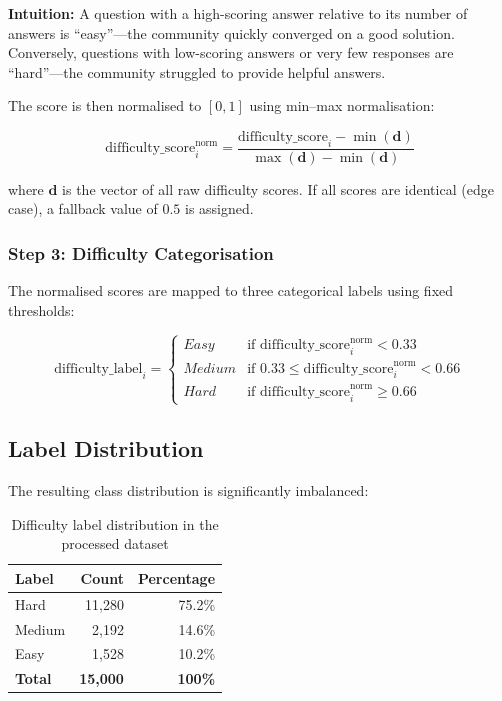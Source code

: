 \documentclass[12pt, a4paper]{article}
\begin{document}
\textbf{Intuition:} A question with a high-scoring answer relative to its number of answers is ``easy''---the community quickly converged on a good solution. Conversely, questions with low-scoring answers or very few responses are ``hard''---the community struggled to provide helpful answers.

The score is then normalised to $[0, 1]$ using min--max normalisation:

\begin{equation}
    \text{difficulty\_score}_i^{\text{norm}} = \frac{\text{difficulty\_score}_i - \min(\mathbf{d})}{\max(\mathbf{d}) - \min(\mathbf{d})}
    \label{eq:minmax}
\end{equation}

where $\mathbf{d}$ is the vector of all raw difficulty scores. If all scores are identical (edge case), a fallback value of $0.5$ is assigned.

\subsubsection{Step 3: Difficulty Categorisation}

The normalised scores are mapped to three categorical labels using fixed thresholds:

\begin{equation}
    \text{difficulty\_label}_i =
    \begin{cases}
        \textit{Easy}   & \text{if } \text{difficulty\_score}_i^{\text{norm}} < 0.33 \\
        \textit{Medium} & \text{if } 0.33 \leq \text{difficulty\_score}_i^{\text{norm}} < 0.66 \\
        \textit{Hard}   & \text{if } \text{difficulty\_score}_i^{\text{norm}} \geq 0.66
    \end{cases}
    \label{eq:thresholds}
\end{equation}

\subsection{Label Distribution}

The resulting class distribution is significantly imbalanced:

\begin{table}[H]
\centering
\caption{Difficulty label distribution in the processed dataset}
\label{tab:label-dist}
\begin{tabular}{lrr}
\toprule
\textbf{Label} & \textbf{Count} & \textbf{Percentage} \\
\midrule
Hard   & 11{,}280 & 75.2\% \\
Medium &  2{,}192 & 14.6\% \\
Easy   &  1{,}528 & 10.2\% \\
\midrule
\textbf{Total} & \textbf{15{,}000} & \textbf{100\%} \\
\bottomrule
\end{tabular}
\end{table}
\end{document}

